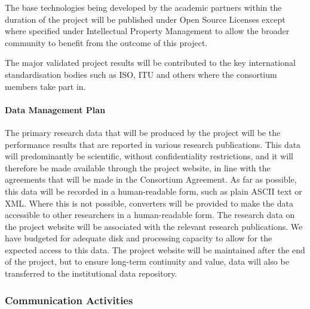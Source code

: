 \documentclass[a4paper,11pt]{article}
\begin{document}
The base technologies being developed by the academic partners within the duration of the project will be published under Open Source Licenses except where specified under Intellectual Property Management to allow the broader community to benefit from the outcome of this project.

The major validated project results  will be contributed to the key international standardisation bodies  such as ISO, ITU and others where the consortium members take part in. 


\paragraph{Data Management Plan}
The primary research data that will be produced by the project will be the performance results that are reported in
various research publications.  This data will predominantly be scientific,
without confidentiality restrictions, and it will
therefore be made available through the project website, in line with the agreements that will be
made in the Consortium Agreement.  As far as possible, 
this data will be recorded in a human-readable form, such as plain ASCII text
or XML.  Where this is not possible, converters will be provided to make the data accessible to other researchers
in a human-readable form. 
The research data on the project website will be associated with the relevant research publications. 
We have budgeted for adequate disk and processing capacity to allow for the expected access to this data.
The project website will be maintained after the end of the project, but to ensure long-term continuity
and value, data will also be transferred to the \SAshort{} institutional data repository.

\draftpage
\subsubsection{Communication Activities}
\label{sect:comm-activities}

\end{document}
